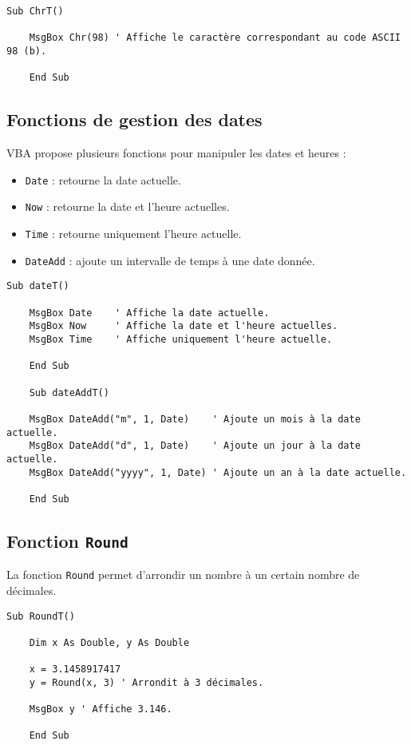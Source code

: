 \documentclass[a4paper,12pt]{report}
\begin{document}
\begin{lstlisting}[caption=Exemple de fonction Chr]
	Sub ChrT()
	
	MsgBox Chr(98) ' Affiche le caractère correspondant au code ASCII 98 (b).
	
	End Sub
\end{lstlisting}

\subsection{Fonctions de gestion des dates}

VBA propose plusieurs fonctions pour manipuler les dates et heures :

\begin{itemize}
	\item \texttt{Date} : retourne la date actuelle.
	\item \texttt{Now} : retourne la date et l'heure actuelles.
	\item \texttt{Time} : retourne uniquement l'heure actuelle.
	\item \texttt{DateAdd} : ajoute un intervalle de temps à une date donnée.
\end{itemize}

\begin{lstlisting}[caption=Exemples de fonctions de gestion des dates]
	Sub dateT()
	
	MsgBox Date    ' Affiche la date actuelle.
	MsgBox Now     ' Affiche la date et l'heure actuelles.
	MsgBox Time    ' Affiche uniquement l'heure actuelle.
	
	End Sub
	
	Sub dateAddT()
	
	MsgBox DateAdd("m", 1, Date)    ' Ajoute un mois à la date actuelle.
	MsgBox DateAdd("d", 1, Date)    ' Ajoute un jour à la date actuelle.
	MsgBox DateAdd("yyyy", 1, Date) ' Ajoute un an à la date actuelle.
	
	End Sub
\end{lstlisting}

\subsection{Fonction \texttt{Round}}
La fonction \texttt{Round} permet d'arrondir un nombre à un certain nombre de décimales.

\begin{lstlisting}[caption=Exemple de fonction Round]
	Sub RoundT()
	
	Dim x As Double, y As Double
	
	x = 3.1458917417
	y = Round(x, 3) ' Arrondit à 3 décimales.
	
	MsgBox y ' Affiche 3.146.
	
	End Sub
\end{lstlisting}
\end{document}

